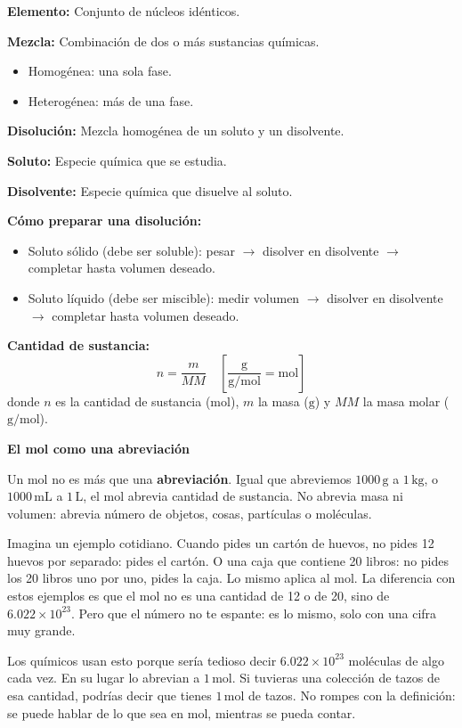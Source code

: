 \textbf{Elemento:} Conjunto de núcleos idénticos.

\textbf{Mezcla:} Combinación de dos o más sustancias químicas.
\begin{itemize}
    \item Homogénea: una sola fase.
    \item Heterogénea: más de una fase.
\end{itemize}

\textbf{Disolución:} Mezcla homogénea de un soluto y un disolvente.

\textbf{Soluto:} Especie química que se estudia.

\textbf{Disolvente:} Especie química que disuelve al soluto.

\textbf{Cómo preparar una disolución:}
\begin{itemize}
    \item Soluto sólido (debe ser soluble): pesar $\to$ disolver en disolvente $\to$ completar hasta volumen deseado.
    \item Soluto líquido (debe ser miscible): medir volumen $\to$ disolver en disolvente $\to$ completar hasta volumen deseado.
\end{itemize}

\textbf{Cantidad de sustancia:}
\begin{equation}
    n = \frac{m}{MM}
    \quad \left[\frac{\mathrm{g}}{\mathrm{g/mol}} = \mathrm{mol}\right]
\end{equation}
donde $n$ es la cantidad de sustancia ($\mathrm{mol}$), $m$ la masa ($\mathrm{g}$) y $MM$ la masa molar ($\mathrm{g/mol}$).

\textbf{El mol como una abreviación}

Un mol no es más que una \textbf{abreviación}. Igual que abreviemos 
$1000\,\mathrm{g}$ a $1\,\mathrm{kg}$, o $1000\,\mathrm{mL}$ a $1\,\mathrm{L}$, 
el mol abrevia cantidad de sustancia. No abrevia masa ni volumen: abrevia 
número de objetos, cosas, partículas o moléculas.

Imagina un ejemplo cotidiano. Cuando pides un cartón de huevos, no pides 12 
huevos por separado: pides el cartón. O una caja que contiene 20 libros: no 
pides los 20 libros uno por uno, pides la caja. Lo mismo aplica al mol. La 
diferencia con estos ejemplos es que el mol no es una cantidad de 12 o de 20, 
sino de $6.022\times10^{23}$. Pero que el número no te espante: es lo mismo, 
solo con una cifra muy grande.

Los químicos usan esto porque sería tedioso decir $6.022\times10^{23}$ 
moléculas de algo cada vez. En su lugar lo abrevian a $1\,\mathrm{mol}$. Si 
tuvieras una colección de tazos de esa cantidad, podrías decir que tienes 
$1\,\mathrm{mol}$ de tazos. No rompes con la definición: se puede hablar de lo 
que sea en mol, mientras se pueda contar.

